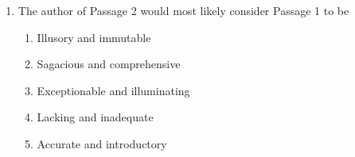 \begin{enumerate}
\newpage
\item The author of Passage 2 would most likely consider Passage 1 to be
\begin{enumerate}[label=(\Alph*)]
\item Illusory and immutable
\item Sagacious and comprehensive
\item Exceptionable and illuminating
\item Lacking and inadequate
\item Accurate and introductory
\end{enumerate}
\end{enumerate}